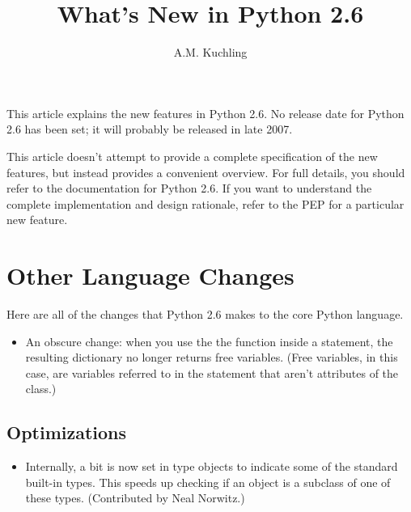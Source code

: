 \documentclass{howto}
\title{What's New in Python 2.6}
\author{A.M. Kuchling}
\begin{document}
\maketitle
\tableofcontents

This article explains the new features in Python 2.6.  No release date
for Python 2.6 has been set; it will probably be released in late 2007.


This article doesn't attempt to provide a complete specification of
the new features, but instead provides a convenient overview.  For
full details, you should refer to the documentation for Python 2.6.
If you want to understand the complete implementation and design
rationale, refer to the PEP for a particular new feature.





\section{Other Language Changes}

Here are all of the changes that Python 2.6 makes to the core Python
language.

\begin{itemize}

\item An obscure change: when you use the the 
function inside a  statement, the resulting dictionary
no longer returns free variables.  (Free variables, in this case, are
variables referred to in the  statement 
that aren't attributes of the class.)

\end{itemize}


\subsection{Optimizations}

\begin{itemize}

\item Internally, a bit is now set in type objects to indicate some of
the standard built-in types.  This speeds up checking if an object is
a subclass of one of these types.  (Contributed by Neal Norwitz.)

\end{itemize}
\end{document}
